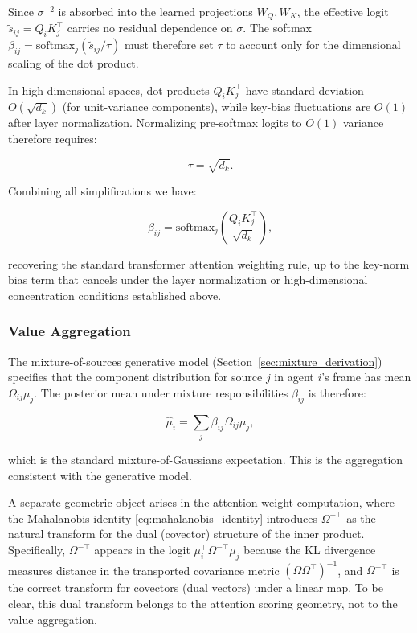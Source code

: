 \documentclass[twoside,11pt]{article}
\begin{document}
Since $\sigma^{-2}$ is absorbed into the learned projections $W_Q, W_K$, the effective logit $\tilde{s}_{ij} = Q_i K_j^\top$ carries no residual dependence on $\sigma$. The softmax $\beta_{ij} = \mathrm{softmax}_j(\tilde{s}_{ij}/\tau)$ must therefore set $\tau$ to account only for the dimensional scaling of the dot product.

In high-dimensional spaces, dot products $Q_iK_j^\top$ have standard deviation $O(\sqrt{d_k})$ (for unit-variance components), while key-bias fluctuations are $O(1)$ after layer normalization. Normalizing pre-softmax logits to $O(1)$ variance therefore requires:

\begin{equation}
\tau = \sqrt{d_k}.
\end{equation}

Combining all simplifications we have:

\begin{equation}
\boxed{\beta_{ij} = \mathrm{softmax}_j\left(\frac{Q_i K_j^\top}{\sqrt{d_k}}\right)},
\end{equation}

recovering the standard transformer attention weighting rule, up to the key-norm bias term that cancels under the layer normalization or high-dimensional concentration conditions established above.

\subsubsection{Value Aggregation}\label{sec:value_aggregation}

The mixture-of-sources generative model (Section~\ref{sec:mixture_derivation}) specifies that the component distribution for source $j$ in agent $i$'s frame has mean $\Omega_{ij}\mu_j$. The posterior mean under mixture responsibilities $\beta_{ij}$ is therefore:

\begin{equation}
\hat\mu_i = \sum_j \beta_{ij} \Omega_{ij}\mu_j,
\label{eq:glk_mixture_aggregation}
\end{equation}

which is the standard mixture-of-Gaussians expectation. This is the aggregation consistent with the generative model.

A separate geometric object arises in the attention weight computation, where the Mahalanobis identity \eqref{eq:mahalanobis_identity} introduces $\Omega^{-\top}$ as the natural transform for the dual (covector) structure of the inner product. Specifically, $\Omega^{-\top}$ appears in the logit $\mu_i^\top \Omega^{-\top}\mu_j$ because the KL divergence measures distance in the transported covariance metric $(\Omega\Omega^\top)^{-1}$, and $\Omega^{-\top}$ is the correct transform for covectors (dual vectors) under a linear map. To be clear, this dual transform belongs to the attention scoring geometry, not to the value aggregation.
\end{document}
